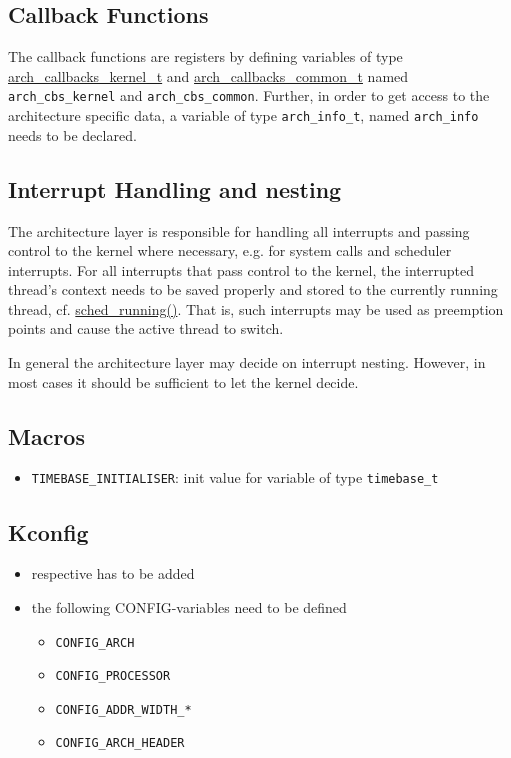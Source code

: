 	\subsection{Callback Functions}
		The callback functions are registers by defining variables of type \hyperref[structarch__callbacks__kernel__t]{arch\_callbacks\_kernel\_t} and \hyperref[structarch__callbacks__common__t]{arch\_callbacks\_common\_t} named \lstinline{arch_cbs_kernel} and \lstinline{arch_cbs_common}. Further, in order to get access to the architecture specific data, a variable of type \lstinline{arch_info_t}, named \lstinline{arch_info} needs to be declared.

	\subsection{Interrupt Handling and nesting}
		The architecture layer is responsible for handling all interrupts and passing control to the kernel where necessary, e.g. for system calls and scheduler interrupts. For all interrupts that pass control to the kernel, the interrupted thread's context needs to be saved properly and stored to the currently running thread, cf. \hyperref[kernel_2sched_8c_a34a33397e7197f803feffb423ce6717a]{sched\_running()}. That is, such interrupts may be used as preemption points and cause the active thread to switch.

		In general the architecture layer may decide on interrupt nesting. However, in most cases it should be sufficient to let the kernel decide.

	\subsection{Macros}
		\begin{itemize}
			\item \lstinline{TIMEBASE_INITIALISER}: init value for variable of type \lstinline{timebase_t}\\
		\end{itemize}

	\subsection{Kconfig}
		\begin{itemize}
			\item respective  has to be added
			\item the following CONFIG-variables need to be defined
				\begin{itemize}
					\item \lstinline{CONFIG_ARCH}
					\item \lstinline{CONFIG_PROCESSOR}
					\item \lstinline{CONFIG_ADDR_WIDTH_*}
					\item \lstinline{CONFIG_ARCH_HEADER}
				\end{itemize}
		\end{itemize}

